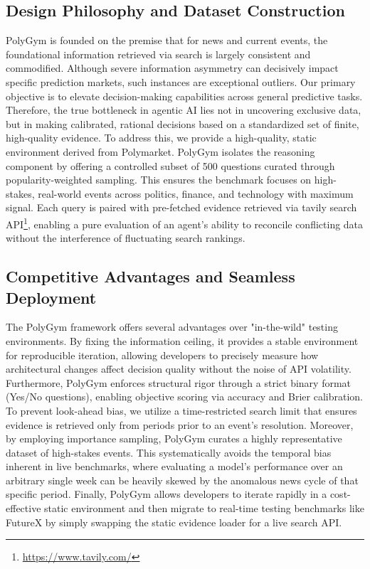 \documentclass[11pt]{article}
\theoremstyle{definition}          %
\begin{document}
\subsection*{Design Philosophy and Dataset Construction}
PolyGym is founded on the premise that for news and current events, the foundational information retrieved via search is largely consistent and commodified. Although severe information asymmetry can decisively impact specific prediction markets, such instances are exceptional outliers. Our primary objective is to elevate decision-making capabilities across general predictive tasks. Therefore, the true bottleneck in agentic AI lies not in uncovering exclusive data, but in making calibrated, rational decisions based on a standardized set of finite, high-quality evidence. To address this, we provide a high-quality, static environment derived from Polymarket. PolyGym isolates the reasoning component by offering a controlled subset of 500 questions curated through popularity-weighted sampling. This ensures the benchmark focuses on high-stakes, real-world events across politics, finance, and technology with maximum signal. Each query is paired with pre-fetched evidence retrieved via tavily search API\footnote{\url{https://www.tavily.com/}}, enabling a pure evaluation of an agent's ability to reconcile conflicting data without the interference of fluctuating search rankings.

\subsection*{Competitive Advantages and Seamless Deployment}
The PolyGym framework offers several advantages over "in-the-wild" testing environments. By fixing the information ceiling, it provides a stable environment for reproducible iteration, allowing developers to precisely measure how architectural changes affect decision quality without the noise of API volatility. Furthermore, PolyGym enforces structural rigor through a strict binary format (Yes/No questions), enabling objective scoring via accuracy and Brier calibration. To prevent look-ahead bias, we utilize a time-restricted search limit that ensures evidence is retrieved only from periods prior to an event’s resolution. Moreover, by employing importance sampling, PolyGym curates a highly representative dataset of high-stakes events. This systematically avoids the temporal bias inherent in live benchmarks, where evaluating a model's performance over an arbitrary single week can be heavily skewed by the anomalous news cycle of that specific period. Finally, PolyGym allows developers to iterate rapidly in a cost-effective static environment and then migrate to real-time testing benchmarks like FutureX by simply swapping the static evidence loader for a live search API.
\end{document}

